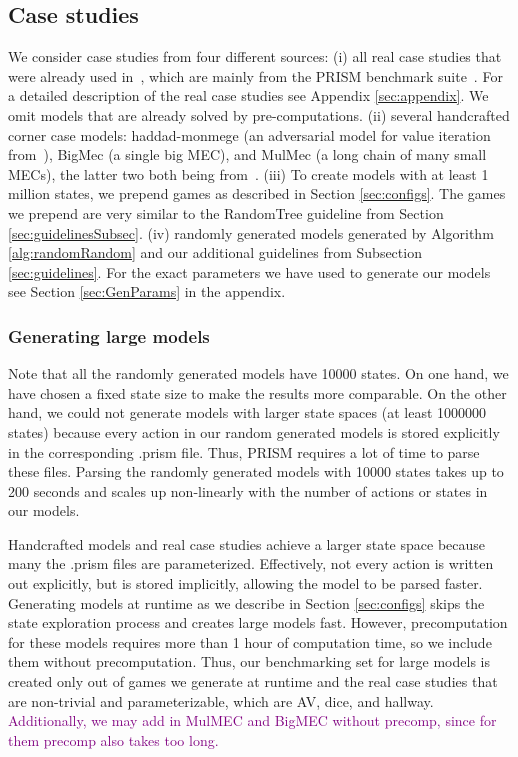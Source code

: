 \subsection{Case studies}
We consider case studies from four different sources: 
(i) all real case studies that were already used in~\cite{gandalf}, which are mainly from the PRISM benchmark suite~\cite{PRISMben}.
For a detailed description of the real case studies see Appendix \ref{sec:appendix}.
We omit models that are already solved by pre-computations.
(ii) several handcrafted corner case models: haddad-monmege (an adversarial model for value iteration from~\cite{haddadmonmege}), BigMec (a single big MEC), and MulMec (a long chain of many small MECs), the latter two both being from~\cite{gandalf}.
(iii) To create models with at least 1 million states, we prepend games as described in Section \ref{sec:configs}.
The games we prepend are very similar to the RandomTree guideline from Section \ref{sec:guidelinesSubsec}.
(iv) randomly generated models generated by Algorithm \ref{alg:randomRandom} and our additional guidelines from Subsection \ref{sec:guidelines}.
For  the exact parameters we have used to generate our models see Section \ref{sec:GenParams} in the appendix.

\subsubsection*{Generating large models} \label{subsec:largeModels}
Note that all the randomly generated models have 10000 states. On one hand, we have chosen a fixed state size to make the results more comparable.
On the other hand, we could not generate models with larger state spaces (at least 1000000 states) because every action in our random generated models is stored explicitly
in the corresponding .prism file. Thus, PRISM requires a lot of time to parse these files. Parsing the randomly generated models with 10000 states takes
up to 200 seconds and scales up non-linearly with the number of actions or states in our models.

Handcrafted models and real case studies achieve a larger state space because many the .prism files are parameterized.
Effectively, not every action is written out explicitly, but is stored implicitly, allowing the model to be parsed faster.
Generating models at runtime as we describe in Section \ref{sec:configs} skips the state exploration process and 
creates large models fast. However, precomputation for these models requires more than 1 hour of computation time, so we include them without precomputation.
Thus, our benchmarking set for large models is created only out of games we generate at runtime and the real case studies that are non-trivial and parameterizable, 
which are AV, dice, and hallway. \textcolor{purple}{Additionally, we may add in MulMEC and BigMEC without precomp, since for them precomp also takes too long.}

